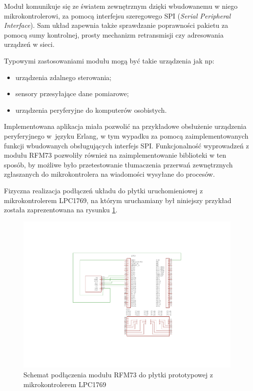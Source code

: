 Moduł komunikuje się ze światem zewnętrznym dzięki wbudowanemu w niego mikrokontrolerowi, za pomocą interfejsu szeregowego SPI (\emph{Serial Peripheral Interface}). Sam układ zapewnia także sprawdzanie poprawności pakietu za pomocą sumy kontrolnej, prosty mechanizm retransmisji czy adresowania urządzeń w sieci.

Typowymi zastosowaniami modułu mogą być takie urządzenia jak np:
\begin{itemize}
\item urządzenia zdalnego sterowania;
\item sensory przesyłające dane pomiarowe;
\item urządzenia peryferyjne do komputerów osobistych.
\end{itemize}

Implementowana aplikacja miała pozwolić na przykładowe obsłużenie urządzenia peryferyjnego w~języku Erlang, w tym wypadku za pomocą zaimplementowanych funkcji wbudowanych obsługujących interfejs SPI.
Funkcjonalność wyprowadzeń z modułu RFM73 pozwoliły również na zaimplementowanie biblioteki w ten sposób, by możliwe było przetestowanie tłumaczenia przerwań zewnętrznych zgłaszanych do mikrokontrolera na wiadomości wysyłane do procesów.

Fizyczna realizacja podłączeń układu do płytki uruchomieniowej z mikrokontrolerem LPC1769, na którym uruchamiany był niniejszy przykład została zaprezentowana na rysunku \ref{fig:examplerfm}.

\begin{figure}[h]
\centerline{\includegraphics[scale=1, clip, trim=0 40mm 0 40mm]{example_rfm}}
\caption{Schemat podłączenia modułu RFM73 do płytki prototypowej z mikrokontrolerem LPC1769}
\label{fig:examplerfm}
\end{figure}


